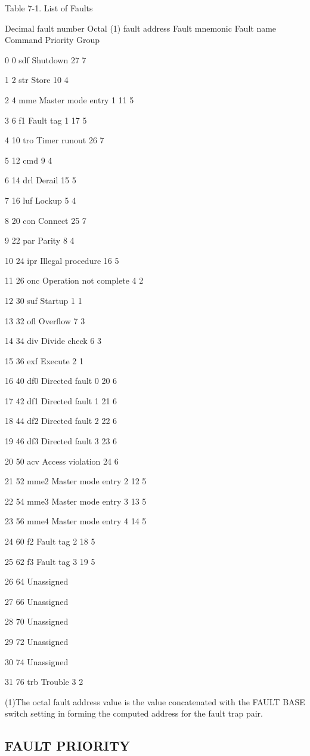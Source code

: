 Table 7-1. List of Faults

Decimal fault number Octal (1) fault address Fault mnemonic Fault name Command Priority Group

0 0 sdf Shutdown 27 7

1 2 str Store 10 4

2 4 mme Master mode entry 1 11 5

3 6 f1 Fault tag 1 17 5

4 10 tro Timer runout 26 7 

5 12 cmd 9 4 

6 14 drl Derail 15 5 

7 16 luf Lockup 5 4 

8 20 con Connect 25 7 

9 22 par Parity 8 4 

10 24 ipr Illegal procedure 16 5 

11 26 onc Operation not complete 4 2 

12 30 suf Startup 1 1 

13 32 ofl Overflow 7 3 

14 34 div Divide check 6 3 

15 36 exf Execute 2 1 

16 40 df0 Directed fault 0 20 6 

17 42 df1 Directed fault 1 21 6 

18 44 df2 Directed fault 2 22 6 

19 46 df3 Directed fault 3 23 6 

20 50 acv Access violation 24 6 

21 52 mme2 Master mode entry 2 12 5 

22 54 mme3 Master mode entry 3 13 5 

23 56 mme4 Master mode entry 4 14 5 

24 60 f2 Fault tag 2 18 5 

25 62 f3 Fault tag 3 19 5 

26 64 Unassigned 

27 66 Unassigned 

28 70 Unassigned 

29 72 Unassigned

30 74 Unassigned 

31 76 trb Trouble 3 2

(1)The octal fault address value is the value concatenated with the FAULT BASE
switch setting in forming the computed address for the fault trap pair.

\subsection{FAULT PRIORITY}


